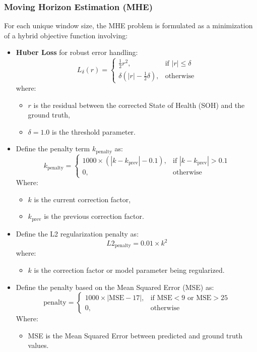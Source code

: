 \subsubsection{Moving Horizon Estimation (MHE)}
For each unique window size, the MHE problem is formulated as a minimization of a hybrid objective function involving:
\begin{itemize}
    \item \textbf{Huber Loss} for robust error handling: \begin{equation}
L_\delta(r) = 
\begin{cases}
\frac{1}{2} r^2, & \text{if } |r| \leq \delta \\
\delta (|r| - \frac{1}{2} \delta), & \text{otherwise}
\end{cases}
\end{equation}
where:
\begin{itemize}
    \item \( r \) is the residual between the corrected State of Health (SOH) and the ground truth,
    \item \( \delta = 1.0 \) is the threshold parameter.
\end{itemize}
\item Define the penalty term \( k_{\text{penalty}} \) as:
\begin{equation}
k_{\text{penalty}} = 
\begin{cases}
1000 \times \left( |k - k_{\text{prev}}| - 0.1 \right), & \text{if } |k - k_{\text{prev}}| > 0.1 \\
0, & \text{otherwise}
\end{cases}
\end{equation}
Where:
\begin{itemize}
    \item \( k \) is the current correction factor,
    \item \( k_{\text{prev}} \) is the previous correction factor.
\end{itemize}
\item Define the L2 regularization penalty as:
\begin{equation}
L2_{\text{penalty}} = 0.01 \times k^2
\end{equation}
where:
\begin{itemize}
    \item \( k \) is the correction factor or model parameter being regularized.
\end{itemize}
\item Define the penalty based on the Mean Squared Error (MSE) as:
\begin{equation}
\text{penalty} = 
\begin{cases}
1000 \times | \text{MSE} - 17 |, & \text{if } \text{MSE} < 9 \text{ or } \text{MSE} > 25 \\
0, & \text{otherwise}
\end{cases}
\end{equation}
Where:
\begin{itemize}
    \item MSE is the Mean Squared Error between predicted and ground truth values.
\end{itemize}
\end{itemize}
